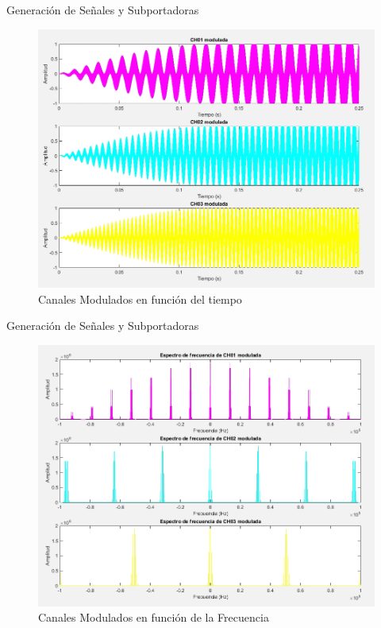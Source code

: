 \documentclass[mathserif,spanish]{beamer}
\begin{document}
\begin{frame}{Generación de Señales y Subportadoras}
    \begin{figure}[h]
        \centering
        \includegraphics[scale=0.2]{CHs_Modu_Frec.png}
      
        \caption{Canales Modulados en función del tiempo}
    \end{figure}
\end{frame}

\begin{frame}{Generación de Señales y Subportadoras}
    \begin{figure}[h]
        \centering
        \includegraphics[scale=0.2]{CHs_mod_Tiem.png}
      
        \caption{Canales Modulados en función de la Frecuencia}
    \end{figure}
\end{frame}
\end{document}
